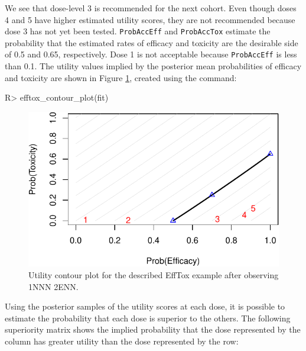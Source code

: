 \documentclass[article]{jss}
\begin{document}
We see that dose-level 3 is recommended for the next cohort. Even though
doses 4 and 5 have higher estimated utility scores, they are not
recommended because dose 3 has not yet been tested. \texttt{ProbAccEff}
and \texttt{ProbAccTox} estimate the probability that the estimated
rates of efficacy and toxicity are the desirable side of 0.5 and 0.65,
respectively. Dose 1 is not acceptable because \texttt{ProbAccEff} is
less than 0.1. The utility values implied by the posterior mean
probabilities of efficacy and toxicity are shown in Figure
\ref{fig:efftox_contours}, created using the command:

\begin{CodeChunk}

\begin{CodeInput}
R> efftox_contour_plot(fit)
\end{CodeInput}
\begin{figure}

{\centering \includegraphics{trialr_files/figure-latex/efftox_contours-1} 

}

\caption[Utility contour plot for the described EffTox example after observing 1NNN 2ENN]{Utility contour plot for the described EffTox example after observing 1NNN 2ENN.}\label{fig:efftox_contours}
\end{figure}
\end{CodeChunk}

Using the posterior samples of the utility scores at each dose, it is
possible to estimate the probability that each dose is superior to the
others. The following superiority matrix shows the implied probability
that the dose represented by the column has greater utility than the
dose represented by the row:
\end{document}
